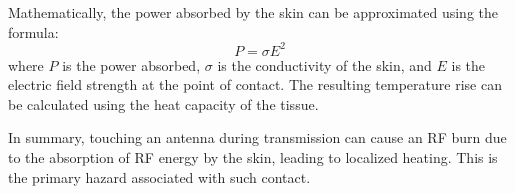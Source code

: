 Mathematically, the power absorbed by the skin can be approximated using the formula:
\[
P = \sigma E^2
\]
where \( P \) is the power absorbed, \( \sigma \) is the conductivity of the skin, and \( E \) is the electric field strength at the point of contact. The resulting temperature rise can be calculated using the heat capacity of the tissue.

In summary, touching an antenna during transmission can cause an RF burn due to the absorption of RF energy by the skin, leading to localized heating. This is the primary hazard associated with such contact.

